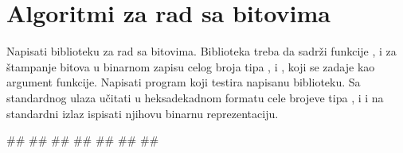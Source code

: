 \section{Algoritmi za rad sa bitovima}

\begin{Exercise}[label=1_05] %
Napisati biblioteku  za rad sa bitovima. Biblioteka treba da sadrži funkcije , 
 i  za štampanje bitova u binarnom zapisu celog broja 
tipa ,  i , koji se zadaje kao argument funkcije. 
Napisati program koji testira napisanu biblioteku. Sa standardnog ulaza učitati u heksadekadnom formatu cele brojeve tipa
,  i  i na standardni izlaz ispisati njihovu binarnu reprezentaciju.

\begin{maxitest}
\begin{upotreba}{1}
#\naslovInt#
##
##
##
##
##
##
\end{upotreba}
\end{maxitest}

\end{Exercise}
\begin{Answer}[ref=1_05]
\end{Answer}

